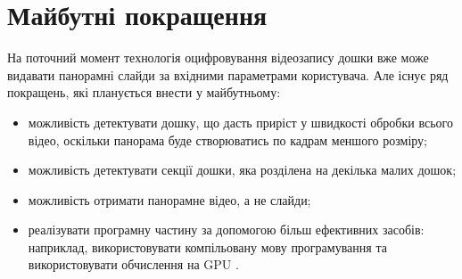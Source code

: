 \section{Майбутні покращення}

На поточний момент технологія оцифровування відеозапису дошки вже може
видавати панорамні слайди за вхідними параметрами користувача. Але існує
ряд покращень, які планується внести у майбутньому:

\begin{itemize}
    \item можливість детектувати дошку, що дасть приріст у швидкості обробки
          всього відео, оскільки панорама буде створюватись по кадрам меншого розміру;
    \item можливість детектувати секції дошки, яка розділена на декілька малих дошок;
    \item можливість отримати панорамне відео, а не слайди;
    \item реалізувати програмну частину за допомогою більш ефективних засобів:
      наприклад, використовувати компільовану мову програмування
      та використовувати обчислення на GPU \cite{cuda,opencl}.
\end{itemize}

\clearpage
